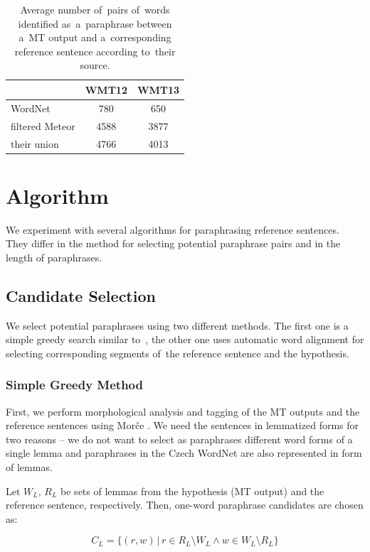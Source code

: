 \begin{table}[t]
\begin{center}
\begin{tabular}{l|cc}
& WMT12 & WMT13 \\
\hline
WordNet            &  780 & 650 \\
filtered Meteor    & 4588 & 3877 \\
their union        & 4766 & 4013 \\
\end{tabular}
\caption{Average number of~pairs of~words identified as~a~paraphrase between 
a~MT output and a~corresponding reference sentence according to~their source.}
\label{number_of_substitutions}
\end{center}
\end{table}
\section{Algorithm}
\label{algorithm}
We experiment with several algorithms for paraphrasing reference sentences. 
They differ in the method for selecting potential paraphrase pairs and in the 
length of paraphrases.

\subsection{Candidate Selection}
We select potential paraphrases using two different methods. The first one is a 
simple greedy search similar to~\citet{kauchak}, the other one uses automatic word
alignment for selecting corresponding segments of~the reference sentence and the 
hypothesis.

\subsubsection{Simple Greedy Method}
First, we perform morphological analysis and tagging of the MT outputs and the 
reference sentences using Morče \cite{morce:2007}. We need the sentences in
lemmatized forms for two reasons -- we do not want to select as paraphrases 
different word forms of a single lemma and paraphrases in the Czech WordNet 
are also represented in form of lemmas.

Let $ W_{L} $, $ R_{L} $ be sets of lemmas
from the hypothesis (MT output) and the reference sentence, respectively. Then, one-word
paraphrase candidates are chosen as:

\begin{equation*}
C_{L} = \{(r,w) \, | \, r \in R_{L} \setminus W_{L} \wedge w \in W_{L} \setminus R_{L} \} 
\end{equation*}

